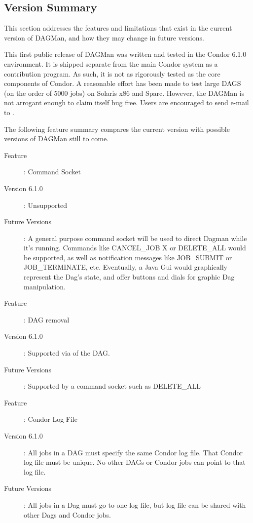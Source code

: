 \subsection{Version Summary}
\label{dagman:version}

This section addresses the features and limitations that exist in the current
version of DAGMan, and how they may change in future versions.

This first public release of DAGMan was written and tested in the Condor 6.1.0
environment.  It is shipped separate from the main Condor system as a
contribution program.  As such, it is not as rigorously tested as the core
components of Condor.  A reasonable effort has been made to test large DAGS
(on the order of 5000 jobs) on Solaris x86 and Sparc.  However, the DAGMan is
not arrogant enough to claim itself bug free.  Users are encouraged to send
e-mail to .

The following feature summary compares the current version with possible
versions of DAGMan still to come.

\begin{description}
\item[Feature] : Command Socket
\item[Version 6.1.0] : Unsupported
\item[Future Versions] : A general purpose command socket will be used to
direct Dagman while it's running.  Commands like CANCEL\_JOB X or DELETE\_ALL
would be supported, as well as notification messages like JOB\_SUBMIT or
JOB\_TERMINATE, etc.  Eventually, a Java Gui would graphically represent the
Dag's state, and offer buttons and dials for graphic Dag manipulation.
\end{description}

\begin{description}
\item[Feature]: DAG removal
\item[Version 6.1.0]: Supported via  of the DAG.
\item[Future Versions]: Supported by a command socket such as DELETE\_ALL
\end{description}

\begin{description}
\item[Feature]: Condor Log File
\item[Version 6.1.0]: All jobs in a DAG must specify the same Condor log file.
That Condor log file must be unique.  No other DAGs or Condor jobs can point
to that log file.
\item[Future Versions]: All jobs in a Dag must go to one log file, but
log file can be shared with other Dags and Condor jobs.
\end{description}

